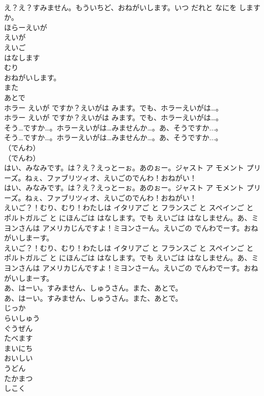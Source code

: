 \documentclass[8pt]{extreport}
\begin{document}
\begin{CJK}{UTF8}{min}
\\	え？え？すみません。もういちど、おねがいします。いつ だれと なにを しますか。 
\\	ほらーえいが
\\	えいが
\\	えいご
\\	はなします
\\	むり
\\	おねがいします。
\\	また
\\	あとで
\\	ホラー えいが ですか？えいがは みます。でも、ホラーえいがは…。	
\\	ホラー えいが ですか？えいがは みます。でも、ホラーえいがは…。 
\\	そう…ですか…。ホラーえいがは…みませんか…。あ、そうですか...。	
\\	そう…ですか…。ホラーえいがは…みませんか…。あ、そうですか...。 
\\	（でんわ）	
\\	（でんわ） 
\\	はい、みなみです。は？え？えっとーぉ。あのぉー。ジャスト ア モメント プリーズ。ねぇ、ファブリツィオ、えいごのでんわ！おねがい！	
\\	はい、みなみです。は？え？えっとーぉ。あのぉー。ジャスト ア モメント プリーズ。ねぇ、ファブリツィオ、えいごのでんわ！おねがい！ 
\\	えいご？！むり、むり！わたしは イタリアご と フランスご と スペインご と ポルトガルご と にほんごは はなします。でも えいごは はなしません。あ、ミヨンさんは アメリカじんですよ！ミヨンさーん。えいごの でんわでーす。おねがいしまーす。	
\\	えいご？！むり、むり！わたしは イタリアご と フランスご と スペインご と ポルトガルご と にほんごは はなします。でも えいごは はなしません。あ、ミヨンさんは アメリカじんですよ！ミヨンさーん。えいごの でんわでーす。おねがいしまーす。 
\\	あ、はーい。すみません、しゅうさん。また、あとで。	
\\	あ、はーい。すみません、しゅうさん。また、あとで。 
\\	じっか
\\	らいしゅう
\\	ぐうぜん
\\	たべます
\\	まいにち
\\	おいしい
\\	うどん
\\	たかまつ
\\	しこく

\end{CJK}
\end{document}
